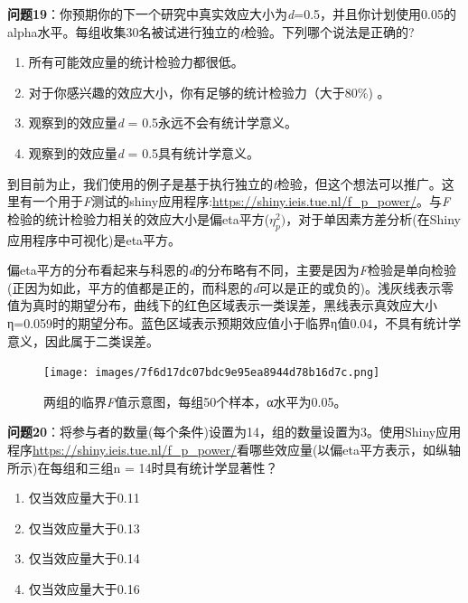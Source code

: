 \documentclass[
  letterpaper,
  DIV=11,
  numbers=noendperiod]{scrreprt}
\providecommand{\tightlist}{%
  \setlength{\itemsep}{0pt}\setlength{\parskip}{0pt}}\usepackage{longtable,booktabs,array}
\begin{document}
\textbf{问题19}：你预期你的下一个研究中真实效应大小为\emph{d}=0.5，并且你计划使用0.05的alpha水平。每组收集30名被试进行独立的\emph{t}检验。下列哪个说法是正确的?

\begin{enumerate}
\def\labelenumi{\Alph{enumi})}
\tightlist
\item
  所有可能效应量的统计检验力都很低。
\item
  对于你感兴趣的效应大小，你有足够的统计检验力（大于80\%) 。
\item
  观察到的效应量\emph{d} = 0.5永远不会有统计学意义。
\item
  观察到的效应量\emph{d} = 0.5具有统计学意义。
\end{enumerate}

到目前为止，我们使用的例子是基于执行独立的\emph{t}检验，但这个想法可以推广。这里有一个用于\emph{F}测试的shiny应用程序:\url{https://shiny.ieis.tue.nl/f_p_power/}。与\emph{F}检验的统计检验力相关的效应大小是偏eta平方(\(\eta_{p}^{2})\)，对于单因素方差分析(在Shiny应用程序中可视化)是eta平方。

偏eta平方的分布看起来与科恩的\emph{d}的分布略有不同，主要是因为\emph{F}检验是单向检验(正因为如此，平方的值都是正的，而科恩的\emph{d}可以是正的或负的)。浅灰线表示零值为真时的期望分布，曲线下的红色区域表示一类误差，黑线表示真效应大小η=0.059时的期望分布。蓝色区域表示预期效应值小于临界η值0.04，不具有统计学意义，因此属于二类误差。

\begin{figure}

{\centering \texttt{[image: images/7f6d17dc07bdc9e95ea8944d78b16d7c.png]}

}

\caption{\label{fig-critf}两组的临界\emph{F}值示意图，每组50个样本，α水平为0.05。}

\end{figure}

\textbf{问题20}：将参与者的数量(每个条件)设置为14，组的数量设置为3。使用Shiny应用程序\url{https://shiny.ieis.tue.nl/f_p_power/}看哪些效应量(以偏eta平方表示，如纵轴所示)在每组和三组n
= 14时具有统计学显著性？

\begin{enumerate}
\def\labelenumi{\Alph{enumi})}
\tightlist
\item
  仅当效应量大于0.11
\item
  仅当效应量大于0.13
\item
  仅当效应量大于0.14
\item
  仅当效应量大于0.16
\end{enumerate}
\end{document}
